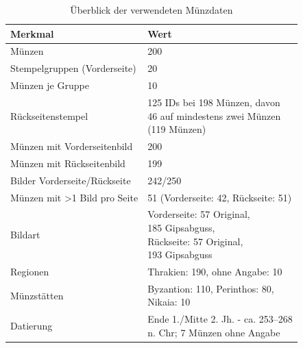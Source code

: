 \begin{table}[H]
\centering
\begin{tabular}{|l|l|}
\hline
\textbf{Merkmal}                                & \textbf{Wert}                             \\ \hline
Münzen                                          & 200                                       \\ \hline
Stempelgruppen (Vorderseite)                    & 20                                        \\ \hline
Münzen je Gruppe                                & 10                                        \\ \hline
Rückseitenstempel                               & 
\makecell[l]{125 IDs bei 198 Münzen, davon \\ 
46 auf mindestens zwei Münzen \\ (119 Münzen)} \\ \hline
Münzen mit Vorderseitenbild                     & 200                                       \\ \hline
Münzen mit Rückseitenbild                       & 199                                       \\ \hline
Bilder Vorderseite/Rückseite                    & 242/250                                   \\ \hline
Münzen mit \textgreater{1} Bild pro Seite & 51 (Vorderseite: 42, Rückseite: 51)                                        \\ \hline
Bildart                                         & \makecell[l]{Vorderseite: 57 Original, \\ 185 Gipsabguss, \\ Rückseite: 57 Original, \\ 193 Gipsabguss} \\ \hline
Regionen                                        & Thrakien: 190, ohne Angabe: 10                          \\ \hline
Münzstätten                                     & \makecell[l]{Byzantion: 110, Perinthos: 80, \\ Nikaia: 10}            \\ \hline
Datierung                                       & \makecell[l]{Ende 1./Mitte 2. Jh. - ca. 253--268 \\ n. Chr; 7 Münzen ohne Angabe}               \\ \hline
\end{tabular}
\caption{Überblick der verwendeten Münzdaten}
\label{tab:muenzdaten}
\end{table}

